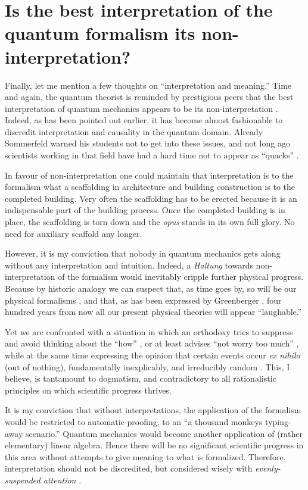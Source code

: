 \documentclass[%
  preprint,
 showpacs,
 showkeys,
 preprintnumbers,
 amsmath,amssymb,
 aps,
   pra,
  longbibliography,
 ]{revtex4-1}
\begin{document}
\section{Is the best interpretation of the quantum formalism its non-interpretation?}

Finally, let me mention a few thoughts on ``interpretation and meaning.''
Time and again, the quantum theorist is reminded by prestigious peers that the best
interpretation of quantum mechanics appears to be its non-interpretation \cite{Fuchs-Peres}.
Indeed, as has been pointed out earlier, it has become almost fashionable to discredit interpretation
and causality in the quantum domain.
Already Sommerfeld warned his students not to get
into these issues,
and not long ago scientists working in that field
have had a hard time not to appear as ``quacks'' \cite{clauser-talkvie}.

In favour of non-interpretation one could maintain that
interpretation is to the formalism what a
scaffolding in architecture and
building construction is to the completed building.
Very often the scaffolding has to be erected because
it is an indispensable part of the building process.
Once the completed building is in place, the scaffolding is torn down and
the {\em opus} stands in its own full glory.
No need for auxiliary scaffold any longer.

However, it is my conviction
that nobody in quantum mechanics gets along without any interpretation
and intuition.
Indeed, a {\it Haltung} towards non-interpretation of the formalism would inevitably cripple further physical progress.
Because by historic analogy we can suspect that, as time goes by, so will be our physical formalisms \cite{lakatosch},
and that, as has been expressed by Greenberger \cite{greenberger-talk-99}, four hundred years from now
all our present physical theories will appear ``laughable.''

Yet we are confronted with a situation in which an orthodoxy tries to suppress and avoid thinking about the ``how'' \cite[p.~129]{feynman-law},
or at least advises ``not worry too much''  \cite{dirac-noworries},
while at the same time expressing the opinion that certain events occur {\it ex nihilo} (out of nothing), fundamentally
inexplicably, and irreducibly random \cite{zeil-05_nature_ofQuantum}.
This, I believe, is tantamount to dogmatism,
and contradictory to all rationalistic principles on which scientific progress thrives.

It is my conviction that
without interpretations, the application of the formalism would be restricted to
automatic proofing, to an ``a thousand monkeys typing-away scenario.''
Quantum mechanics would become another application of (rather elementary) linear algebra.
Hence   there will be no significant scientific progress in this area without
attempts to give meaning to what is formalized.
Therefore, interpretation should not be discredited,
but considered wisely with {\em evenly-suspended attention}
\cite{Freud-1912}.
\end{document}
